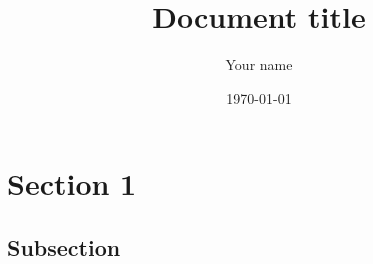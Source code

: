\documentclass[a4paper]{article}
\author{Your name}
\date{\today}
\title{Document title}
\begin{document}
\maketitle

\tableofcontents

\section{Section 1}

\subsection{Subsection}
\end{document}
